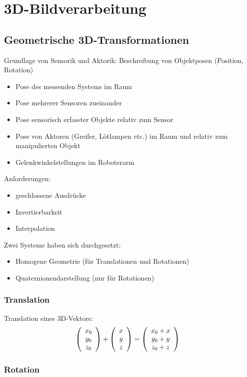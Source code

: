 
\chapter{3D-Bildverarbeitung}



\section{Geometrische 3D-Transformationen}

Grundlage von Sensorik und Aktorik: Beschreibung von Objektposen (Position, Rotation)
\begin{itemize}
\item Pose des messenden Systems im Raum
\item Pose mehrerer Sensoren zueinander
\item Pose sensorisch erfasster Objekte relativ zum Sensor
\item Pose von Aktoren (Greifer, Lötlampen etc.) im Raum und relativ zum manipulierten Objekt
\item Gelenkwinkelstellungen im Roboterarm
\end{itemize}
Anforderungen:
\begin{itemize}
\item geschlossene Ausdrücke
\item Invertierbarkeit
\item Interpolation
\end{itemize}
Zwei Systeme haben sich durchgesetzt:
\begin{itemize}
\item Homogene Geometrie (für Translationen und Rotationen)
\item Quaternionendarstellung (nur für Rotationen)
\end{itemize}

\subsection{Translation}

Translation eines 3D-Vektors: $$\left( \begin{array}{c} x_0 \\ y_0 \\ z_0 \end{array} \right) + \left( \begin{array}{c} x \\ y \\ z \end{array} \right) = \left( \begin{array}{c} x_0 + x \\ y_0 + y \\ z_0 + z \end{array} \right)$$

\subsection{Rotation}

